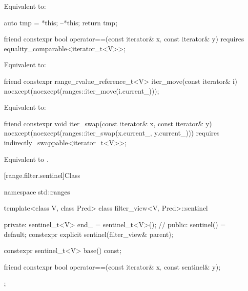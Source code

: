 \begin{itemdescr}
\pnum
\effects
Equivalent to:
\begin{codeblock}
auto tmp = *this;
--*this;
return tmp;
\end{codeblock}
\end{itemdescr}

%
\begin{itemdecl}
friend constexpr bool operator==(const iterator& x, const iterator& y)
  requires equality_comparable<iterator_t<V>>;
\end{itemdecl}

\begin{itemdescr}
\pnum
\effects
Equivalent to: 
\end{itemdescr}

%
\begin{itemdecl}
friend constexpr range_rvalue_reference_t<V> iter_move(const iterator& i)
  noexcept(noexcept(ranges::iter_move(i.current_)));
\end{itemdecl}

\begin{itemdescr}
\pnum
\effects
Equivalent to: 
\end{itemdescr}

%
\begin{itemdecl}
friend constexpr void iter_swap(const iterator& x, const iterator& y)
  noexcept(noexcept(ranges::iter_swap(x.current_, y.current_)))
  requires indirectly_swappable<iterator_t<V>>;
\end{itemdecl}

\begin{itemdescr}
\pnum
\effects
Equivalent to .
\end{itemdescr}

[range.filter.sentinel]{Class }

%
\begin{codeblock}
namespace std::ranges {
  template<class V, class Pred>
  class filter_view<V, Pred>::sentinel {
  private:
    sentinel_t<V> end_ = sentinel_t<V>();       // \expos
  public:
    sentinel() = default;
    constexpr explicit sentinel(filter_view& parent);

    constexpr sentinel_t<V> base() const;

    friend constexpr bool operator==(const iterator& x, const sentinel& y);
  };
}
\end{codeblock}

